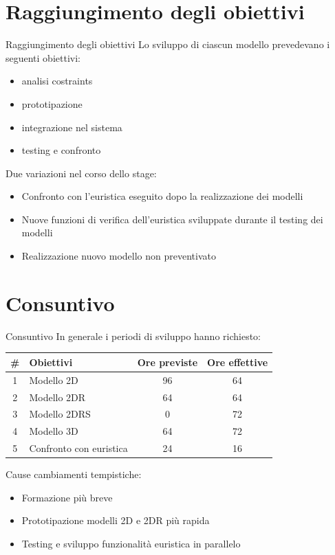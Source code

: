 \documentclass{beamer}
\begin{document}
\section{Raggiungimento degli obiettivi}
\begin{frame}{Raggiungimento degli obiettivi}
	Lo sviluppo di ciascun modello prevedevano i seguenti obiettivi:
	\begin{itemize}
		\item analisi costraints
		\item prototipazione
		\item integrazione nel sistema
		\item testing e confronto	
	\end{itemize}
	
	Due variazioni nel corso dello stage:
	\begin{itemize}
		\item Confronto con l'euristica eseguito dopo la realizzazione dei modelli
		\item Nuove funzioni di verifica dell'euristica sviluppate durante il testing dei modelli
		\item Realizzazione nuovo modello non preventivato
	\end{itemize}
\end{frame}
\section{Consuntivo}
\begin{frame}{Consuntivo}
	In generale i periodi di sviluppo hanno richiesto:
	\begin{center}
		\begin{tabular}{|c|l|c|c|}
			\hline
			\textbf{\#} & \textbf{Obiettivi} & \textbf{Ore previste} & \textbf{Ore effettive} \\\hline
			1           & Modello 2D               & 96                    & 64                     \\\hline
			2           & Modello 2DR              & 64                    & 64                     \\\hline
			3           & Modello 2DRS             & 0                     & 72                     \\\hline
			4           & Modello 3D               & 64                    & 72                     \\\hline
			5           & Confronto con euristica  & 24                    & 16                     \\\hline
		\end{tabular}
	\end{center}
	Cause cambiamenti tempistiche:
	\begin{itemize}
		\item Formazione pi\`u breve
		\item Prototipazione modelli 2D e 2DR pi\`u rapida
		\item Testing e sviluppo funzionalit\`a euristica in parallelo
	\end{itemize}
\end{frame}
\end{document}
